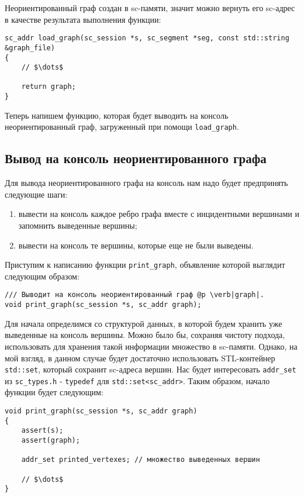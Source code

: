 Неориентированный граф создан в sc-памяти, значит можно вернуть его
sc-адрес в качестве результата выполнения функции:
\begin{lstlisting}[texcl]
sc_addr load_graph(sc_session *s, sc_segment *seg, const std::string &graph_file)
{
    // $\dots$

    return graph;
}
\end{lstlisting}

Теперь напишем функцию, которая будет выводить на консоль
неориентированный граф, загруженный при помощи \lstinline|load_graph|.

\subsection{Вывод на консоль неориентированного графа}
\label{sec:libscprg_print_graph}

Для вывода неориентированного графа на консоль нам надо будет
предпринять следующие шаги:
\begin{enumerate}
\item вывести на консоль каждое ребро графа вместе с инцидентными
  вершинами и запомнить выведенные вершины;
\item вывести на консоль те вершины, которые еще не были выведены.
\end{enumerate}

Приступим к написанию функции \lstinline|print_graph|, объявление
которой выглядит следующим образом:
\begin{lstlisting}[texcl]
/// Выводит на консоль неориентированный граф @p \verb|graph|.
void print_graph(sc_session *s, sc_addr graph);
\end{lstlisting}

Для начала определимся со структурой данных, в которой будем хранить
уже выведенные на консоль вершины. Можно было бы, сохраняя чистоту
подхода, использовать для хранения такой информации множество в
sc-памяти. Однако, на мой взгляд, в данном случае будет достаточно
использовать STL-контейнер \lstinline|std::set|, который сохранит
sc-адреса вершин. Нас будет интересовать \lstinline|addr_set| из
\verb|sc_types.h| - \lstinline|typedef| для
\lstinline|std::set<sc_addr>|. Таким образом, начало функции будет
следующим:
\begin{lstlisting}[texcl]
void print_graph(sc_session *s, sc_addr graph)
{
    assert(s);
    assert(graph);

    addr_set printed_vertexes; // множество выведенных вершин

    // $\dots$
}
\end{lstlisting}

